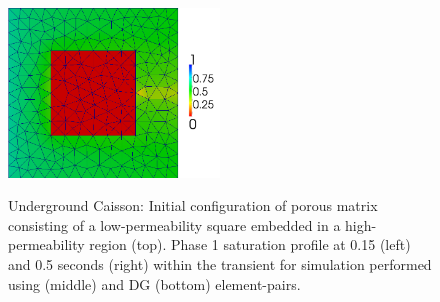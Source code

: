 \begin{figure}[h]
{{\hspace{-0.cm}\includegraphics[width=0.5\textwidth]{dg_square_05_low}}}
 \caption{Underground Caisson: Initial configuration of porous matrix consisting of a low-permeability square embedded in a high-permeability region (top). Phase 1 saturation profile at 0.15 (left) and 0.5 seconds (right) within the transient for simulation performed using  (middle) and DG (bottom) element-pairs.\label{fig:square_permeability}}
\end{figure}


